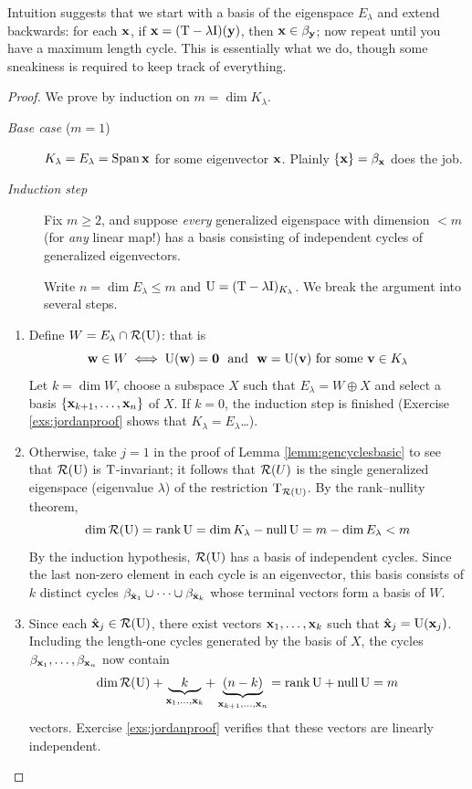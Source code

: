 Intuition suggests that we start with a basis of the eigenspace $E_\lambda$ and extend backwards: for each ${\mathbf{x}}$, if ${\mathbf{x}}=(\mathrm{T}-\lambda\mathrm{I})({\mathbf{y}})$, then ${\mathbf{x}}\in\beta_{\mathbf{y}}$; now repeat until you have a maximum length cycle. This is essentially what we do, though some sneakiness is required to keep track of everything.

\begin{proof}
	We prove by induction on $m=\dim K_\lambda$.
	\begin{description}
		\item[\normalfont\emph{Base case} ($m=1$)] $K_\lambda=E_\lambda=\operatorname{Span}{\mathbf{x}}$ for some eigenvector ${\mathbf{x}}$. Plainly $\{{\mathbf{x}}\}=\beta_{\mathbf{x}}$ does the job.
		\item[\normalfont\emph{Induction step}] Fix $m\ge 2$, and suppose \emph{every} generalized eigenspace with dimension $<m$ (for \emph{any} linear map!) has a basis consisting of independent cycles of generalized eigenvectors.\par
		Write $n=\dim E_\lambda\le m$ and $\mathrm{U}=(\mathrm{T}-\lambda\mathrm{I})_{K_\lambda}$. We break the argument into several steps. 
	\end{description}
	\begin{enumerate}
	  \item Define $W=E_\lambda\cap \mathcal{R}(\mathrm{U})$: that is
	  \[
	  	\vw\in W\iff
	  	\rU(\vw)=\V0\ \text{ and }\ 
	  	\vw=\rU(\vv)\text{ for some }\vv\in K_\lambda
	  \]
	  Let $k=\dim W$, choose a subspace $X$ such that $E_\lambda=W\oplus X$ and select a basis $\{{\mathbf{x}}_{k+1},\ldots,{\mathbf{x}}_n\}$ of $X$.
	   If $k=0$, the induction step is finished (Exercise \ref{exs:jordanproof} shows that $K_\lambda=E_\lambda$\ldots).
	  
	  
	  \item Otherwise, take $j=1$ in the proof of Lemma \ref{lemm:gencyclesbasic} to see that $\mathcal{R}(\mathrm{U})$ is $\mathrm{T}$-invariant; it follows that $\mathcal{R}(U)$ is the single generalized eigenspace (eigenvalue $\lambda$) of the restriction $\mathrm{T}_{\mathcal{R}(\mathrm{U})}$. By the rank--nullity theorem,
		\[
			\dim \mathcal{R}(\mathrm{U})=\operatorname{rank}\mathrm{U}=\dim K_\lambda-\operatorname{null}\mathrm{U}=m-\dim E_\lambda <m
		\]
		By the induction hypothesis, $\mathcal{R}(\mathrm{U})$ has a basis of independent cycles. Since the last non-zero element in each cycle is an eigenvector, this basis consists of $k$ distinct cycles $\beta_{\hat{{\mathbf{x}}}_1}\cup\cdots\cup\beta_{\hat{{\mathbf{x}}}_k}$ whose terminal vectors form a basis of $W$.
		
	  \item Since each $\hat{{\mathbf{x}}}_j\in\mathcal{R}(\mathrm{U})$, there exist vectors ${\mathbf{x}}_1,\ldots,{\mathbf{x}}_{k}$ such that $\hat{{\mathbf{x}}}_j=\mathrm{U}({\mathbf{x}}_j)$. Including the length-one cycles generated by the basis of $X$, the cycles $\beta_{{\mathbf{x}}_1},\ldots,\beta_{{\mathbf{x}}_n}$ now contain
	  \[
	  	\dim\mathcal{R}(\mathrm{U})+ \underbrace{\quad k\quad}_{{\mathbf{x}}_1,\ldots,{\mathbf{x}}_{k}} +\underbrace{(n-k)}_{{\mathbf{x}}_{k+1},\ldots,{\mathbf{x}}_n}
	  	=\operatorname{rank}\mathrm{U}+\operatorname{null}\mathrm{U}=m
	  \]
	  vectors. Exercise \ref{exs:jordanproof} verifies that these vectors are linearly independent.\qedhere
	\end{enumerate} 
\end{proof}


